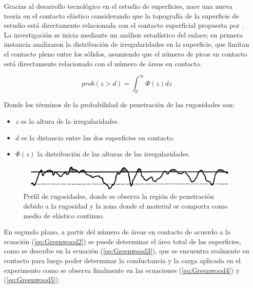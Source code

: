 \documentclass[main]{subfiles}
\begin{document}
 Gracias al desarrollo tecnológico en el estudio de superficies, nace una nueva teoría en el contacto elástico considerando que la topografía de la superficie de estudio está directamente relacionada con el contacto superficial propuesta por \citet{Greenwood06121966}.  La investigación se inicia mediante un análisis estadístico del enlace; en primera instancia analizaron la distribución de irregularidades en la superficie, que limitan el contacto pleno entre los sólidos, asumiendo que el número de picos en contacto está directamente relacionado con el número de áreas en contacto.

\begin{equation}
\label{eq:Greenwood1}
prob(z>d)=\int_d^\infty \Phi(z) dz
\end{equation}

\par \hspace{1cm}
\begin{minipage}{10cm}
\begin{spacing}{0.5}
Donde los términos de la probabilidad de penetración de las rugosidades son:
\begin{itemize}
\item $z$ es la altura de la irregularidades.
\item $d$ es la distancia entre las dos superficies en contacto.
\item $\Phi(z)$ la distribución de las alturas de las irregularidades.
\end{itemize}
\end{spacing}
\end{minipage}


\begin{figure}[!htbp]
\centering
    \includegraphics[scale=0.5]{Greenwood1.png}
  \caption{Perfil de rugosidades, donde se observa la región de penetración debido a la rugosidad y la zona donde el material se comporta como medio de elástico continuo.}
  \label{fig:Greenwood1}
\end{figure} 


  En segundo plano, a partir del número de áreas en contacto de acuerdo a la ecuación (\ref{eq:Greenwood2}) se puede determinar el área total de las superficies, como se describe en la ecuación (\ref{eq:Greenwood3}), que se encuentra realmente en contacto para luego poder determinar la conductancia y la carga aplicada en el experimento como se observa finalmente en las ecuaciones (\ref{eq:Greenwood4}) y (\ref{eq:Greenwood5}).
\end{document}
